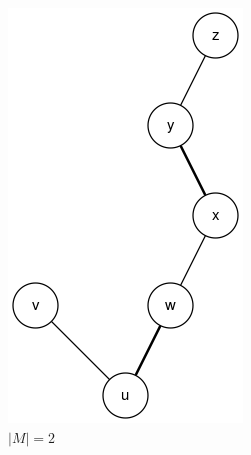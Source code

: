 \documentclass{article}      %
\begin{document}
\begin{figure}
\begin{subfigure}[b]{0.25\textwidth}
		\includegraphics[width=\textwidth]{img/graph2.png}
		\caption{$|M|=2$}
		\label{fig:rw-aug-b}
	\end{subfigure}
	\qquad
	\begin{subfigure}[b]{0.25\textwidth}

\end{subfigure}
\end{figure}
\end{document}
